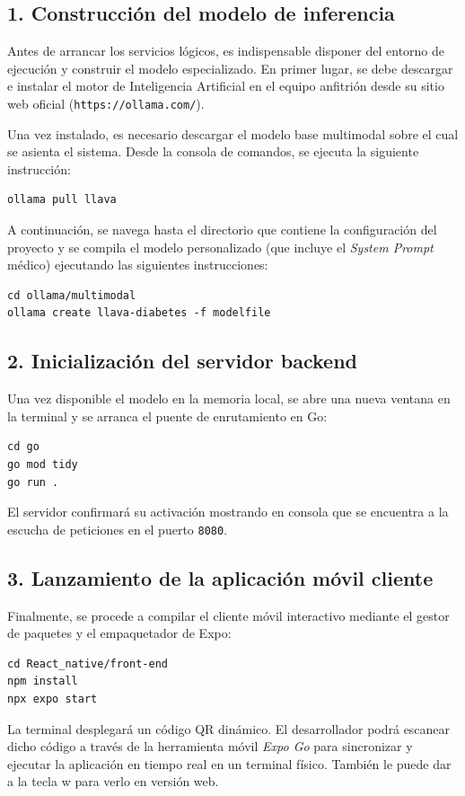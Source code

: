 \subsection*{1. Construcción del modelo de inferencia}
Antes de arrancar los servicios lógicos, es indispensable disponer del entorno de ejecución y construir el modelo especializado. En primer lugar, se debe descargar e instalar el motor de Inteligencia Artificial en el equipo anfitrión desde su sitio web oficial (\texttt{https://ollama.com/}). 

Una vez instalado, es necesario descargar el modelo base multimodal sobre el cual se asienta el sistema. Desde la consola de comandos, se ejecuta la siguiente instrucción:
\begin{verbatim}
ollama pull llava
\end{verbatim}

A continuación, se navega hasta el directorio que contiene la configuración del proyecto y se compila el modelo personalizado (que incluye el \textit{System Prompt} médico) ejecutando las siguientes instrucciones:
\begin{verbatim}
cd ollama/multimodal
ollama create llava-diabetes -f modelfile
\end{verbatim}

\subsection*{2. Inicialización del servidor backend}
Una vez disponible el modelo en la memoria local, se abre una nueva ventana en la terminal y se arranca el puente de enrutamiento en Go:
\begin{verbatim}
cd go
go mod tidy
go run .
\end{verbatim}
El servidor confirmará su activación mostrando en consola que se encuentra a la escucha de peticiones en el puerto \texttt{8080}.

\subsection*{3. Lanzamiento de la aplicación móvil cliente}
Finalmente, se procede a compilar el cliente móvil interactivo mediante el gestor de paquetes y el empaquetador de Expo:
\begin{verbatim}
cd React_native/front-end
npm install
npx expo start
\end{verbatim}
La terminal desplegará un código QR dinámico. El desarrollador podrá escanear dicho código a través de la herramienta móvil \textit{Expo Go} para sincronizar y ejecutar la aplicación en tiempo real en un terminal físico.
También le puede dar a la tecla w para verlo en versión web.

